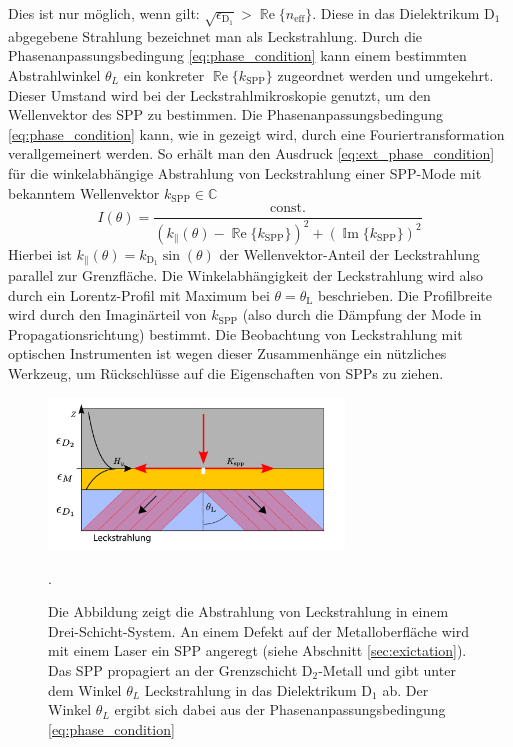 \documentclass[a4paper, titlepage,  ngerman, fullpage]{book}
\renewcommand{\Re}{\operatorname{\mathbb{R}e}}
\renewcommand{\Im}{\operatorname{\mathbb{I}m}}
\begin{document}
	Dies ist nur möglich, wenn gilt: {$\sqrt{\epsilon_{\mathrm{D}_1}} > \Re\{n_\mathrm{eff}\}$}. Diese in das Dielektrikum $\mathrm{D}_1$ abgegebene Strahlung bezeichnet man als Leckstrahlung. Durch die Phasenanpassungsbedingung \eqref{eq:phase_condition} kann einem bestimmten Abstrahlwinkel $\theta_L$ ein konkreter $\Re\{k_{\mathrm{SPP}}\}$ zugeordnet werden und umgekehrt. Dieser Umstand wird bei der Leckstrahlmikroskopie genutzt, um den Wellenvektor des SPP zu bestimmen.
	Die Phasenanpassungsbedingung \eqref{eq:phase_condition} kann, wie in \cite{Burke.1986} gezeigt wird, durch eine Fouriertransformation verallgemeinert werden. So erhält man den Ausdruck \eqref{eq:ext_phase_condition} für die winkelabhängige Abstrahlung von Leckstrahlung einer SPP-Mode mit bekanntem Wellenvektor $k_{\mathrm{SPP}} \in \mathbb{C}$
	\begin{equation}
		\label{eq:ext_phase_condition}
		I(\theta) = \dfrac{\text{const.}}{\left(k_{\parallel}(\theta) - \Re\{k_{\mathrm{SPP}}\}\right)^2 + (\Im\{k_{\mathrm{SPP}}\})^2}
	\end{equation}
	Hierbei ist $k_{\parallel}(\theta) = k_{\mathrm{D}_1}\sin(\theta)$ der Wellenvektor-Anteil der Leckstrahlung parallel zur Grenzfläche. Die Winkelabhängigkeit der Leckstrahlung wird also durch ein Lorentz-Profil mit Maximum bei $\theta = \theta_\mathrm{L}$ beschrieben. Die Profilbreite wird durch den Imaginärteil von $k_{\mathrm{SPP}}$ (also durch die Dämpfung der Mode in Propagationsrichtung) bestimmt. Die Beobachtung von Leckstrahlung mit optischen Instrumenten ist wegen dieser Zusammenhänge ein nützliches Werkzeug, um Rückschlüsse auf die Eigenschaften von SPPs zu ziehen.
	\begin{figure} 
		\centering
		\includegraphics[width=0.7\textwidth]{figures/leckstrahlung.pdf}
		\caption[Leckstrahlung Drei-Schicht-System]{Die Abbildung zeigt die Abstrahlung von Leckstrahlung in einem Drei-Schicht-System. An einem Defekt auf der Metalloberfläche wird mit einem Laser ein SPP angeregt (siehe Abschnitt \ref{sec:exictation}). Das SPP propagiert an der Grenzschicht $\mathrm{D}_2$-Metall und gibt unter dem Winkel $\theta_L$ Leckstrahlung in das Dielektrikum $\mathrm{D}_1$ ab. Der Winkel $\theta_L$ ergibt sich dabei aus der Phasenanpassungsbedingung \eqref{eq:phase_condition}}.
		\label{fig:leakage_radiation}
	\end{figure}
\end{document}
